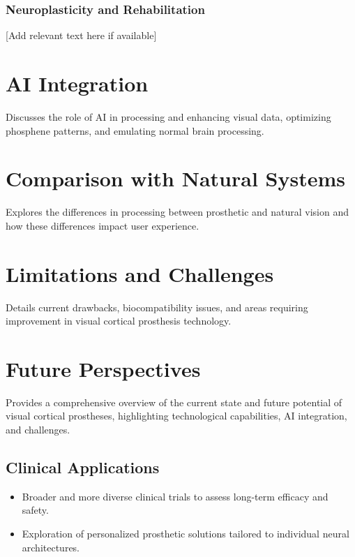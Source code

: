 \documentclass[twocolumn,10pt]{article}
\begin{document}
\subsubsection*{Neuroplasticity and Rehabilitation}
[Add relevant text here if available]


\section{AI Integration}\label{sec:ai_integration}
Discusses the role of AI in processing and enhancing visual data, optimizing
phosphene patterns, and emulating normal brain processing.

\section{Comparison with Natural Systems}\label{sec:comparison}
Explores the differences in processing between prosthetic and natural vision and
how these differences impact user experience.

\section{Limitations and Challenges}\label{sec:limitations}
Details current drawbacks, biocompatibility issues, and areas requiring
improvement in visual cortical prosthesis technology.

\section{Future Perspectives}\label{sec:future}
Provides a comprehensive overview of the current state and future potential of
visual cortical prostheses, highlighting technological capabilities, AI
integration, and challenges.

\subsection{Clinical Applications}
\begin{itemize}
      \item Broader and more diverse clinical trials to assess long-term efficacy
            and safety.
      \item Exploration of personalized prosthetic solutions tailored to
            individual neural architectures.
\end{itemize}
\end{document}
